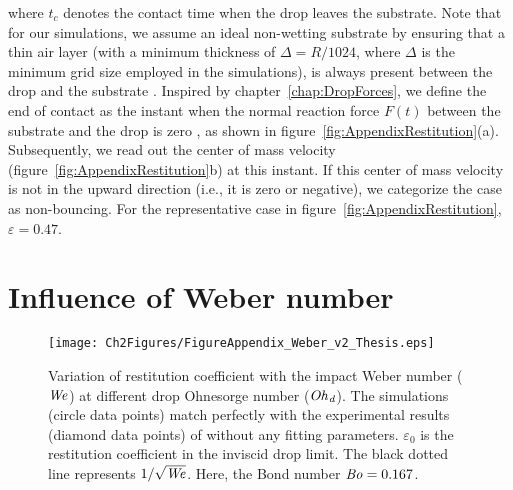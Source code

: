 \begin{subappendices}
	\noindent where $t_c$ denotes the contact time when the drop leaves the substrate. Note that for our simulations, we assume an ideal non-wetting substrate by ensuring that a thin air layer (with a minimum thickness of $\Delta = R/1024$, where $\Delta$ is the minimum grid size employed in the simulations), is always present between the drop and the substrate \citep[also see][]{ramirez2020lifting}. Inspired by chapter~\ref{chap:DropForces}, we define the end of contact as the instant when the normal reaction force $F(t)$ between the substrate and the drop is zero \citep[for calculation details, see equation~\eqref{Ch2:Eqn::force2} and][]{zhang2022impact}, as shown in figure~\ref{fig:AppendixRestitution}(a). Subsequently, we read out the center of mass velocity (figure~\ref{fig:AppendixRestitution}b) at this instant. If this center of mass velocity is not in the upward direction (i.e., it is zero or negative), we categorize the case as non-bouncing. For the representative case in figure~\ref{fig:AppendixRestitution}, $\varepsilon = 0.47$. 
	
	\section{Influence of Weber number}\label{app:Weber}
	\begin{figure}
		\centering
		\texttt{[image: Ch2Figures/FigureAppendix\_Weber\_v2\_Thesis.eps]}
		\caption{Variation of restitution coefficient with the impact Weber number ($\mathit{We}$) at different drop Ohnesorge number ($\mathit{Oh}_\mathit{d}$). The simulations (circle data points) match perfectly with the experimental results (diamond data points) of \citet{jha2020viscous} without any fitting parameters. $\varepsilon_0$ is the restitution coefficient in the inviscid drop limit. The black dotted line represents $1/\sqrt{\mathit{We}}$. Here, the Bond number $\mathit{Bo} =0.167$.}
		\label{fig:AppendixWeber}
	\end{figure}
	

\end{subappendices}
